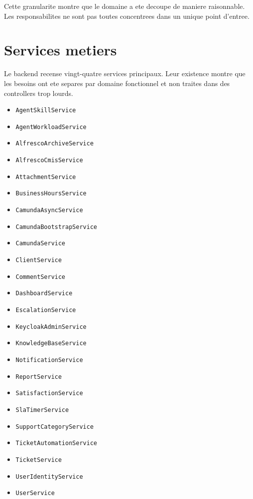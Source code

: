 Cette granularite montre que le domaine a ete decoupe de maniere raisonnable. Les responsabilites ne sont pas toutes concentrees dans un unique point d'entree.

\section{Services metiers}

Le backend recense vingt-quatre services principaux. Leur existence montre que les besoins ont ete separes par domaine fonctionnel et non traites dans des controllers trop lourds.

\begin{itemize}[leftmargin=1.2cm]
  \item \texttt{AgentSkillService}
  \item \texttt{AgentWorkloadService}
  \item \texttt{AlfrescoArchiveService}
  \item \texttt{AlfrescoCmisService}
  \item \texttt{AttachmentService}
  \item \texttt{BusinessHoursService}
  \item \texttt{CamundaAsyncService}
  \item \texttt{CamundaBootstrapService}
  \item \texttt{CamundaService}
  \item \texttt{ClientService}
  \item \texttt{CommentService}
  \item \texttt{DashboardService}
  \item \texttt{EscalationService}
  \item \texttt{KeycloakAdminService}
  \item \texttt{KnowledgeBaseService}
  \item \texttt{NotificationService}
  \item \texttt{ReportService}
  \item \texttt{SatisfactionService}
  \item \texttt{SlaTimerService}
  \item \texttt{SupportCategoryService}
  \item \texttt{TicketAutomationService}
  \item \texttt{TicketService}
  \item \texttt{UserIdentityService}
  \item \texttt{UserService}
\end{itemize}

